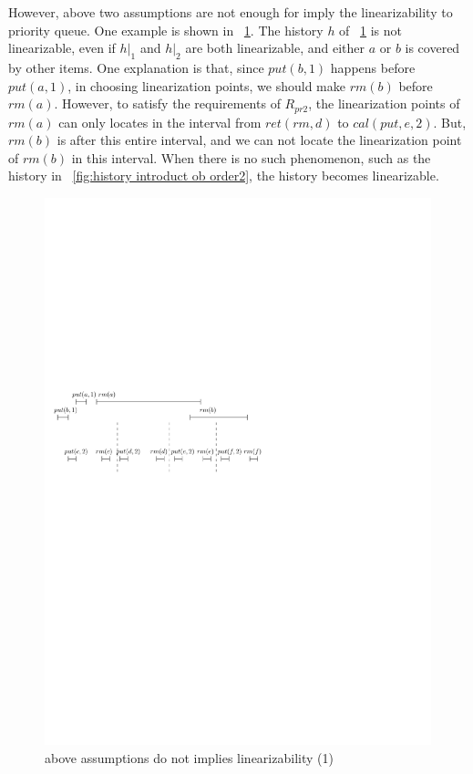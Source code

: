However, above two assumptions are not enough for imply the linearizability to priority queue. One example is shown in \figurename~\ref{fig:history introduct ob order1}. The history $h$ of \figurename~\ref{fig:history introduct ob order1} is not linearizable, even if $h \vert_{1}$ and $h \vert_{2}$ are both linearizable, and either $a$ or $b$ is covered by other items. One explanation is that, since $\textit{put}(b,1)$ happens before $\textit{put}(a,1)$, in choosing linearization points, we should make $\textit{rm}(b)$ before $\textit{rm}(a)$. However, to satisfy the requirements of $R_{\textit{pr2}}$, the linearization points of $\textit{rm}(a)$ can only locates in the interval from $\textit{ret}(\textit{rm},d)$ to $\textit{cal}(\textit{put},e,2)$. But, $\textit{rm}(b)$ is after this entire interval, and we can not locate the linearization point of $\textit{rm}(b)$ in this interval. When there is no such phenomenon, such as the history in \figurename~\ref{fig:history introduct ob order2}, the history becomes linearizable.

\begin{figure}[htbp]
  \centering
  \includegraphics[width=0.6 \textwidth]{PIC-HIS-INTRO-OB-ORDER1.pdf}
  \caption{above assumptions do not implies linearizability (1)}
  \label{fig:history introduct ob order1}
\end{figure}




